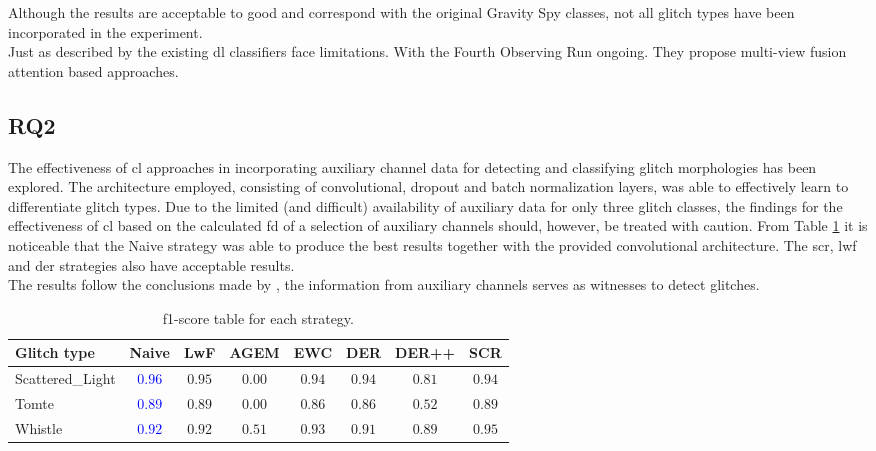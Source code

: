 Although the results are acceptable to good and correspond with the original Gravity Spy classes, not all glitch types have been incorporated in the experiment. \\
Just as described by \citep{wu2024advancing} the existing \acrshort{dl} classifiers face limitations. With the Fourth Observing Run ongoing. They propose multi-view fusion attention based approaches. 

\subsection{RQ2}
The effectiveness of \acrshort{cl} approaches in incorporating auxiliary channel data for detecting and classifying glitch morphologies has been explored. The architecture employed, consisting of convolutional, dropout and batch normalization layers, was able to effectively learn to differentiate glitch types. 
Due to the limited (and difficult) availability of auxiliary data for only three glitch classes, the findings for the effectiveness of \acrshort{cl} based on the calculated \acrshort{fd} of a selection of auxiliary channels should, however, be treated with caution. 
From Table \ref{tbl:RQ2_discus_overview_f1_score} it is noticeable that the Naive strategy was able to produce the best results together with the provided convolutional architecture. The \acrshort{scr}, \acrshort{lwf} and \acrshort{der} strategies also have acceptable results. \\
The results follow the conclusions made by \citep{laguarta2024detection}, the information from auxiliary channels serves as witnesses to detect glitches. 

\begin{table}[ht]
\centering
    \begin{tabular}{|l|c c c c c c c|}
    \hline
    \textbf{Glitch type} & \textbf{Naive} & \textbf{LwF} & \textbf{AGEM} & \textbf{EWC} & \textbf{DER} & \textbf{DER++} & \textbf{SCR}\\ \hline
    Scattered\_Light & \textcolor{blue}{$0.96$} & $0.95$ &$0.00$ & $0.94$ & $0.94$ & $0.81$ & $0.94$\\
    Tomte & \textcolor{blue}{$0.89$} & $0.89$ &$0.00$ & $0.86$ & $0.86$ & $0.52$ & $0.89$\\
    Whistle & \textcolor{blue}{$0.92$} & $0.92$ & $0.51$ & $0.93$ & $0.91$ & $0.89$ & $0.95$\\
    \hline
    \end{tabular}
    \caption{f1-score table for each strategy.}
    \label{tbl:RQ2_discus_overview_f1_score}
\end{table}

